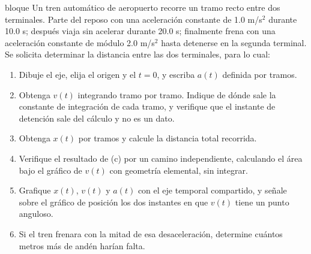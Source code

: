\documentclass[11pt,openany]{book}
\begin{document}
\begin{ejercicio}{bloque}
Un tren automático de aeropuerto recorre un tramo recto entre dos terminales. Parte del reposo con una aceleración constante de 1.0 m/s$^2$ durante 10.0 s; después viaja sin acelerar durante 20.0 s; finalmente frena con una aceleración constante de módulo 2.0 m/s$^2$ hasta detenerse en la segunda terminal. Se solicita determinar la distancia entre las dos terminales, para lo cual:
\begin{enumerate}[label=(\alph*), leftmargin=1.7em, itemsep=1pt, topsep=3pt]
  \item Dibuje el eje, elija el origen y el $t = 0$, y escriba $a(t)$ definida por tramos.
  \item Obtenga $v(t)$ integrando tramo por tramo. Indique de dónde sale la constante de integración de cada tramo, y verifique que el instante de detención sale del cálculo y no es un dato.
  \item Obtenga $x(t)$ por tramos y calcule la distancia total recorrida.
  \item Verifique el resultado de (c) por un camino independiente, calculando el área bajo el gráfico de $v(t)$ con geometría elemental, sin integrar.
  \item Grafique $x(t)$, $v(t)$ y $a(t)$ con el eje temporal compartido, y señale sobre el gráfico de posición los dos instantes en que $v(t)$ tiene un punto anguloso.
  \item Si el tren frenara con la mitad de esa desaceleración, determine cuántos metros más de andén harían falta.
\end{enumerate}
\end{ejercicio}
\end{document}
